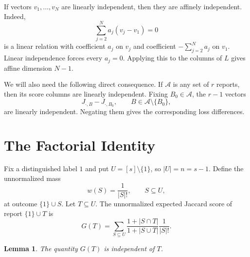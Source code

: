 \documentclass[twoside]{article}
\newtheorem{lemma}[theorem]{Lemma}
\newcommand{\1}{\mathbf 1}
\begin{document}
If vectors $v_1,\ldots,v_N$ are linearly independent, then they are affinely independent. Indeed,
\begin{equation}
\sum_{j=2}^N a_j(v_j-v_1)=0
\end{equation}
is a linear relation with coefficient $a_j$ on $v_j$ and coefficient $-\sum_{j=2}^Na_j$ on $v_1$. Linear independence forces every $a_j=0$. Applying this to the columns of $L$ gives affine dimension $N-1$.

We will also need the following direct consequence. If $\mathcal A$ is any set of $r$ reports, then its score columns are linearly independent. Fixing $B_0\in\mathcal A$, the $r-1$ vectors
\begin{equation}
J_{\cdot,B}-J_{\cdot,B_0},
\qquad B\in\mathcal A\setminus\{B_0\},
\label{eq:supp-active-differences}
\end{equation}
are linearly independent. Negating them gives the corresponding loss differences.

\section{The Factorial Identity}

Fix a distinguished label $1$ and put $U=[s]\setminus\{1\}$, so $|U|=n=s-1$. Define the unnormalized mass
\begin{equation}
w(S)=\frac1{|S|!},
\qquad S\subseteq U,
\label{eq:supp-weight}
\end{equation}
at outcome $\{1\}\cup S$. Let $T\subseteq U$. The unnormalized expected Jaccard score of report $\{1\}\cup T$ is
\begin{equation}
G(T)=\sum_{S\subseteq U}
\frac{1+|S\cap T|}{1+|S\cup T|}\frac1{|S|!}.
\label{eq:supp-G}
\end{equation}

\begin{lemma}
The quantity $G(T)$ is independent of $T$.
\end{lemma}
\end{document}
